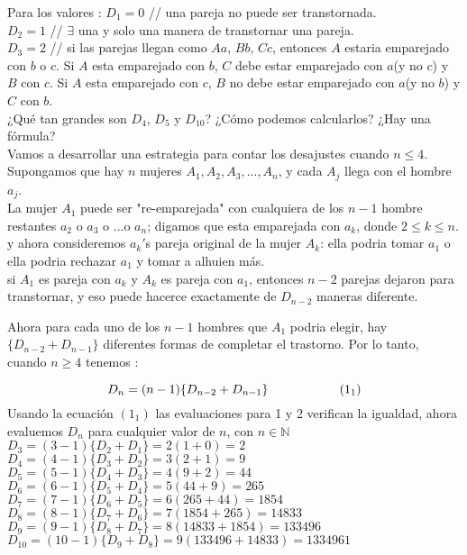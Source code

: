 \documentclass[11pt,a4paper]{article}
\begin{document}
Para los valores :\newline
$D_{1} = 0$ \hspace*{0.5cm} // una pareja no puede ser transtornada.\\
$D_{2} = 1$ \hspace*{0.5cm} // $\exists$ una y solo una manera de transtornar una pareja.\\ 
$D_{3} = 2$ \hspace*{0.5cm} // si las parejas llegan como $Aa$, $Bb$, $Cc$, entonces $A$ estaria emparejado con $b$ o $c$. Si $A$ esta emparejado con $b$, $C$ debe estar emparejado con $a$(y no $c$) y $B$ con $c$. Si $A$ esta emparejado con $c$, $B$ no debe estar emparejado con $a$(y no $b$) y $C$ con $b$.\\ \newline
¿Qué tan grandes son $D_{4}$, $D_{5}$ y $D_{10}$? ¿Cómo podemos calcularlos? ¿Hay una fórmula?\\

Vamos a desarrollar una estrategia para contar los desajustes cuando $n \leq 4$. Supongamos que hay $n$ mujeres $A_{1}, A_{2}, A_{3},...,A_{n}$, y cada $A_{j}$ llega con el hombre $a_{j}$.\\

La mujer $A_{1}$ puede ser "re-emparejada" con cualquiera de los $n-1$ hombre restantes $a_{2}$ o $a_{3}$ o ...o $a_{n}$; digamos que esta emparejada con $a_{k}$, donde $2\leq k \leq n.$ y ahora consideremos $a_{k}'$s pareja original de la mujer $A_{k}$: ella podria tomar $a_{1}$ o ella podria rechazar $a_{1}$ y tomar a alhuien más.\\

si $A_{1}$ es pareja con $a_{k}$ y $A_{k}$ es pareja con $a_{1}$, entonces $n-2$ parejas dejaron para transtornar, y eso puede hacerce exactamente de $D_{n-2}$ maneras diferente.

Ahora para cada uno de los $n-1$ hombres que $A_{1}$ podria elegir, hay $\{D_{n-2}+ D_{n-1}\}$ diferentes formas de completar el trastorno. Por lo tanto, cuando $n \geq 4$ tenemos :


$$ D_{n} = (n-1)\{ D_{n-2} + D_{n-1}\} \hspace*{2cm} (1_1) $$ 
Usando la ecuación $(1_1)$ las evaluaciones para 1 y 2 verifican la igualdad, ahora evaluemos $D_{n}$ para cualquier valor de $n$, con $n \in \mathbb{N}$\\ \newline
$D_{3} = (3 - 1)\{D_{2} + D_{1}\} = 2(1 + 0) = 2$\\
$D_{4} = (4 - 1)\{D_{3} + D_{2}\} = 3(2 + 1) = 9$\\
$D_{5} = (5 - 1)\{D_{4} + D_{3}\} = 4(9 + 2) = 44$\\
$D_{6} = (6 - 1)\{D_{5} + D_{4}\} = 5(44 + 9) = 265$\\
$D_{7} = (7 - 1)\{D_{6} + D_{5}\} = 6(265 + 44) = 1854$\\
$D_{8} = (8 - 1)\{D_{7} + D_{6}\} = 7(1854 + 265) = 14833$\\
$D_{9} = (9 - 1)\{D_{8} + D_{7}\} = 8(14833 + 1854) = 133496$\\
$D_{10}= (10 - 1)\{D_{9} + D_{8}\} = 9(133496 + 14833) = 1334961$\\
\end{document}
